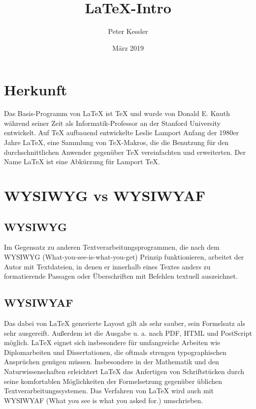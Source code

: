 \documentclass[12pt, a4paper]{article}
\title{\LaTeX-Intro}          %
\author{Peter Kessler}        %
\date{März 2019}              %
\begin{document}
\maketitle

\pagebreak
\tableofcontents

\pagebreak 
\section{Herkunft}

Das Basis-Programm von LaTeX ist TeX und wurde von Donald E. Knuth während seiner Zeit als Informatik-Professor an der Stanford University entwickelt. Auf TeX aufbauend entwickelte Leslie Lamport Anfang der 1980er Jahre LaTeX, eine Sammlung von TeX-Makros, die die Benutzung für den durchschnittlichen Anwender gegenüber TeX vereinfachten und erweiterten. Der Name LaTeX ist eine Abkürzung für Lamport TeX. 

\pagebreak
\section{WYSIWYG vs WYSIWYAF}

\subsection{WYSIWYG}
Im Gegensatz zu anderen Textverarbeitungsprogrammen, die nach dem WYSIWYG (What-you-see-is-what-you-get) Prinzip funktionieren, arbeitet der Autor mit Textdateien, in denen er innerhalb eines Textes anders zu formatierende Passagen oder Überschriften mit Befehlen textuell auszeichnet.

\subsection{WYSIWYAF}
Das dabei von LaTeX generierte Layout gilt als sehr sauber, sein Formelsatz als sehr ausgereift. Außerdem ist die Ausgabe u. a. nach PDF, HTML und PostScript möglich. LaTeX eignet sich insbesondere für umfangreiche Arbeiten wie Diplomarbeiten und Dissertationen, die oftmals strengen typographischen Ansprüchen genügen müssen. Insbesondere in der Mathematik und den Naturwissenschaften erleichtert LaTeX das Anfertigen von Schriftstücken durch seine komfortablen Möglichkeiten der Formelsetzung gegenüber üblichen Textverarbeitungssystemen. Das Verfahren von LaTeX wird auch mit WYSIWYAF (What you see is what you asked for.) umschrieben. 
\end{document}
